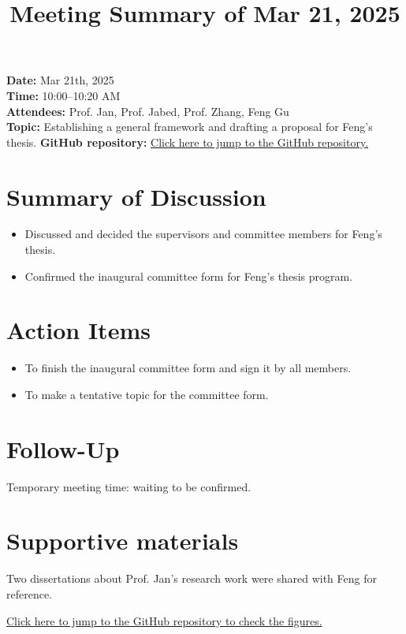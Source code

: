 \documentclass[11pt]{article}
\title{Meeting Summary of Mar 21, 2025}
\date{}  %
\author{}
\begin{document}
\maketitle

\noindent
\textbf{Date:} Mar 21th, 2025 \\
\textbf{Time:} 10:00--10:20 AM \\
\textbf{Attendees:} Prof. Jan, Prof. Jabed, Prof. Zhang, Feng Gu \\
\textbf{Topic:} Establishing a general framework and drafting a proposal for Feng's thesis.
\textbf{GitHub repository:} \href{https://github.com/Gufeng-2002/Thesis_Meeting_Notes/tree/main/Mar_21th_25_meeting_notes}{Click here to jump to the GitHub repository.}

\vspace{1em}

\section*{Summary of Discussion}
\begin{itemize}[leftmargin=1.5em]
    \item Discussed and decided the supervisors and committee members for Feng's thesis.
    \item Confirmed the inaugural committee form for Feng's thesis program.
\end{itemize}


\section*{Action Items}
\begin{itemize}[leftmargin=1.5em]
    \item To finish the inaugural committee form and sign it by all members.
    \item To make a tentative topic for the committee form.
\end{itemize}

\section*{Follow-Up}
Temporary meeting time: waiting to be confirmed.

\section*{Supportive materials}
Two dissertations about Prof. Jan's research work were shared with Feng for reference.

\href{https://github.com/Gufeng-2002/Thesis_Meeting_Notes/tree/main/Mar_21th_25_meeting_notes/supportive_materials}{Click here to jump to the GitHub repository to check the figures.}
\end{document}
